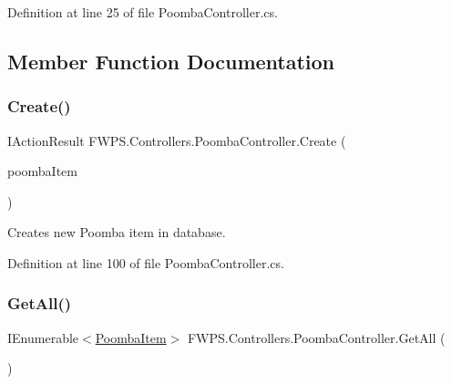 Definition at line 25 of file Poomba\+Controller.\+cs.



\subsection{Member Function Documentation}
\mbox{\label{class_f_w_p_s_1_1_controllers_1_1_poomba_controller_afb34ea874e3d77cf6e3db3b2263f32f9}} 
\subsubsection{\texorpdfstring{Create()}{Create()}}
{\footnotesize\ttfamily I\+Action\+Result F\+W\+P\+S.\+Controllers.\+Poomba\+Controller.\+Create (\begin{DoxyParamCaption}\item[{\mbox{[}\+From\+Body\mbox{]} \mbox{\hyperlink{class_f_w_p_s_1_1_models_1_1_poomba_item}{Poomba\+Item}}}]{poomba\+Item }\end{DoxyParamCaption})}



Creates new Poomba item in database. 



Definition at line 100 of file Poomba\+Controller.\+cs.

\mbox{\label{class_f_w_p_s_1_1_controllers_1_1_poomba_controller_ae19ff49329ce6d7e134336fe61691370}} 
\subsubsection{\texorpdfstring{Get\+All()}{GetAll()}}
{\footnotesize\ttfamily I\+Enumerable$<$\mbox{\hyperlink{class_f_w_p_s_1_1_models_1_1_poomba_item}{Poomba\+Item}}$>$ F\+W\+P\+S.\+Controllers.\+Poomba\+Controller.\+Get\+All (\begin{DoxyParamCaption}{ }\end{DoxyParamCaption})}



